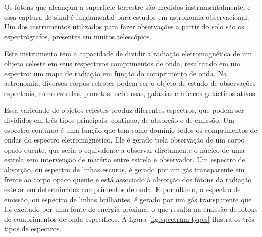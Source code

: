Os fótons que alcançam a superfície terrestre são medidos instrumentalmente, e essa captura de sinal é fundamental para estudos em astronomia observacional. Um dos instrumentos utilizados para fazer observações a partir do solo são os espectrógrafos, presentes em muitos telescópios. 

Este instrumento tem a capacidade de dividir a radiação eletromagnética de um objeto celeste em seus respectivos comprimentos de onda, resultando em um espectro: um mapa de radiação em função do comprimento de onda. Na astronomia, diversos corpos celestes podem ser o objeto de estudo de observações espectrais, como estrelas, planetas, nebulosas, galáxias e núcleos galácticos ativos.  


Essa variedade de objetos celestes produz diferentes espectros, que podem ser divididos em três tipos principais: contínuo, de absorção e de emissão. Um espectro contínuo é uma função que tem como domínio todos os comprimentos de ondas do espectro eletromagnético.
Ele é gerado pela observação de um corpo opaco quente, que seria o equivalente a observar diretamente o núcleo de uma estrela sem intervenção de matéria entre estrela e observador. Um espectro de absorção, ou espectro de linhas escuras, é gerado por um gás transparente em frente ao corpo opaco quente  e está associado à absorção dos fótons da radiação estelar em determinados comprimentos de onda. E por último, o espectro de emissão, ou espectro de linhas brilhantes, é gerado por um gás transparente que foi excitado por uma fonte de energia próxima, o que resulta na emissão de fótons de comprimentos de onda específicos. A figura \ref{fig:spectrum-types} ilustra os três tipos de espectros. 

